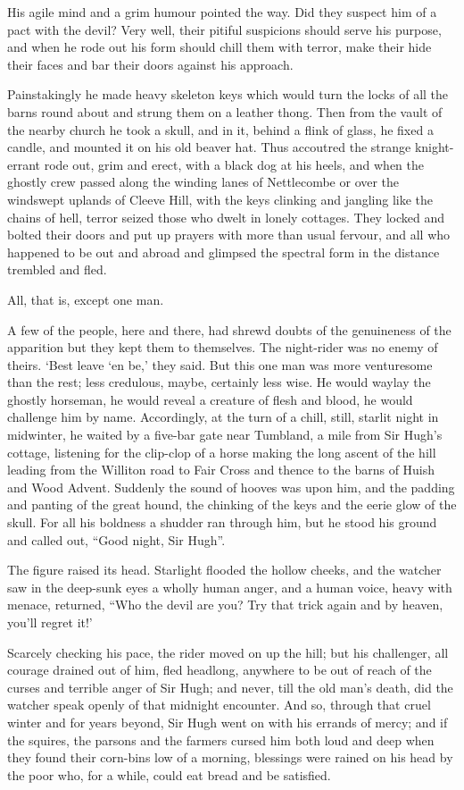 His agile mind and a grim humour pointed the way. Did they suspect him of a pact with the devil? Very well, their pitiful suspicions should serve his purpose, and when he rode out his form should chill them with terror, make their hide their faces and bar their doors against his approach.

Painstakingly he made heavy skeleton keys which would turn the locks of all the barns round about and strung them on a leather thong. Then from the vault of the nearby church he took a skull, and in it, behind a flink of glass, he fixed a candle, and mounted it on his old beaver hat. Thus accoutred the strange knight-errant rode out, grim and erect, with a black dog at his heels, and when the ghostly crew passed along the winding lanes of Nettlecombe or over the windswept uplands of Cleeve Hill, with the keys clinking and jangling like the chains of hell, terror seized those who dwelt in lonely cottages. They locked and bolted their doors and put up prayers with more than usual fervour, and all who happened to be out and abroad and glimpsed the spectral form in the distance trembled and fled.

All, that is, except one man.

A few of the people, here and there, had shrewd doubts of the genuineness of the apparition but they kept them to themselves. The night-rider was no enemy of theirs. ‘Best leave ‘en be,’ they said. But this one man was more venturesome than the rest; less credulous, maybe, certainly less wise. He would waylay the ghostly horseman, he would reveal a creature of flesh and blood, he would challenge him by name. Accordingly, at the turn of a chill, still, starlit night in midwinter, he waited by a five-bar gate near Tumbland, a mile from Sir Hugh’s cottage, listening for the clip-clop of a horse making the long ascent of the hill leading from the Williton road to Fair Cross and thence to the barns of Huish and Wood Advent. Suddenly the sound of hooves was upon him, and the padding and panting of the great hound, the chinking of the keys and the eerie glow of the skull. For all his boldness a shudder ran through him, but he stood his ground and called out, “Good night, Sir Hugh”.

The figure raised its head. Starlight flooded the hollow cheeks, and the watcher saw in the deep-sunk eyes a wholly human anger, and a human voice, heavy with menace, returned, “Who the devil are you? Try that trick again and by heaven, you’ll regret it!’

Scarcely checking his pace, the rider moved on up the hill; but his challenger, all courage drained out of him, fled headlong, anywhere to be out of reach of the curses and terrible anger of Sir Hugh; and never, till the old man’s death, did the watcher speak openly of that midnight encounter. And so, through that cruel winter and for years beyond, Sir Hugh went on with his errands of mercy; and if the squires, the parsons and the farmers cursed him both loud and deep when they found their corn-bins low of a morning, blessings were rained on his head by the poor who, for a while, could eat bread and be satisfied.

